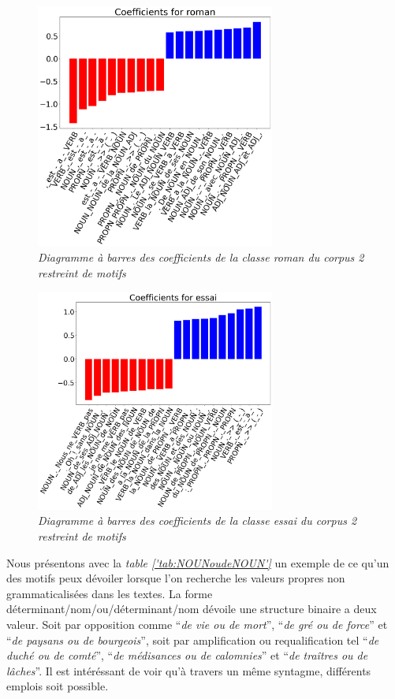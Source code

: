 \begin{figure}[H]
\centering %
\includegraphics[width=0.70\textwidth]{img/coefs_roman_corpus2restreint.png}
\caption{\textit{Diagramme à barres des coefficients de la classe roman du corpus 2 restreint de motifs}}
\label{'fig:coefs_roman_corpus2restreint'}
\end{figure}

\begin{figure}[H]
\centering %
\includegraphics[width=0.70\textwidth]{img/coefs_essai_corpus2restreint.png}
\caption{\textit{Diagramme à barres des coefficients de la classe essai du corpus 2 restreint de motifs}}
\label{'fig:coefs_essai_corpus2restreint'}
\end{figure}

Nous présentons avec la \textit{table \ref{'tab:NOUNoudeNOUN'}} un exemple de ce qu'un des motifs peux dévoiler lorsque l'on recherche les valeurs propres non grammaticalisées dans les textes. La forme déterminant/nom/ou/déterminant/nom dévoile une structure binaire a deux valeur. Soit par opposition comme \enquote{\textit{de vie ou de mort}}, \enquote{\textit{de gré ou de force}} et \enquote{\textit{de paysans ou de bourgeois}}, soit par amplification ou requalification tel \enquote{\textit{de duché ou de comté}}, \enquote{\textit{de médisances ou de calomnies}} et \enquote{\textit{de traîtres ou de lâches}}. Il est intéréssant de voir qu'à travers un même syntagme, différents emplois soit possible.

